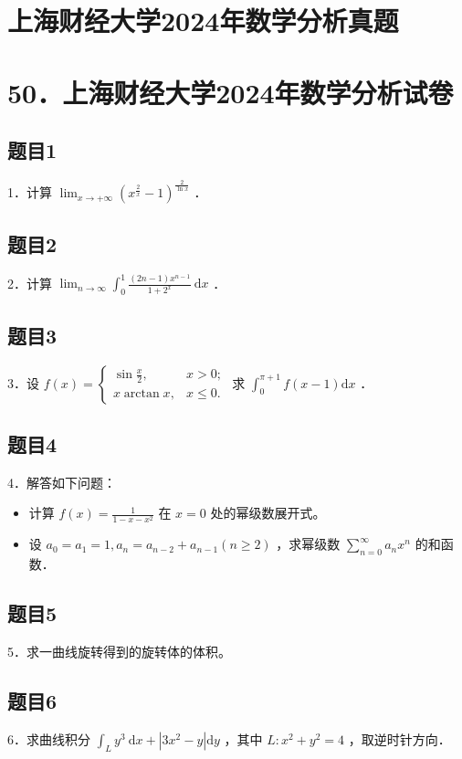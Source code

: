 \documentclass{article}
\begin{document}
\section*{上海财经大学2024年数学分析真题}
\section*{50．上海财经大学2024年数学分析试卷}

\subsection{题目1}
1．计算 \(\lim _{x \rightarrow+\infty}\left(x^{\frac{2}{x}}-1\right)^{\frac{2}{\ln x}}\) ．

\subsection{题目2}
2．计算 \(\lim _{n \rightarrow \infty} \int_{0}^{1} \frac{(2 n-1) x^{n-1}}{1+2^{x}} \mathrm{~d} x\) ．

\subsection{题目3}
3．设 \(f(x)=\left\{\begin{array}{ll}\sin \frac{x}{2}, & x>0 ; \\ x \arctan x, & x \leq 0 .\end{array}\right.\) 求 \(\int_{0}^{\pi+1} f(x-1) \mathrm{d} x\) ．

\subsection{题目4}
4．解答如下问题：

\begin{itemize}
  \item[（1）] 计算 \(f(x)=\frac{1}{1-x-x^{2}}\) 在 \(x=0\) 处的幂级数展开式。
  \item[（2）] 设 \(a_{0}=a_{1}=1, a_{n}=a_{n-2}+a_{n-1}(n \geq 2)\) ，求幂级数 \(\sum_{n=0}^{\infty} a_{n} x^{n}\) 的和函数．
\end{itemize}

\subsection{题目5}
5．求一曲线旋转得到的旋转体的体积。

\subsection{题目6}
6．求曲线积分 \(\int_{L} y^{3} \mathrm{~d} x+\left|3 x^{2}-y\right| \mathrm{d} y\) ，其中 \(L: x^{2}+y^{2}=4\) ，取逆时针方向．
\end{document}
